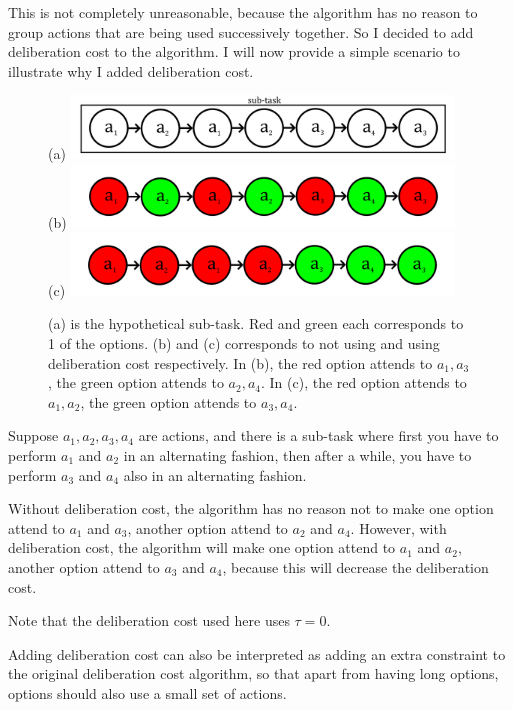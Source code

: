 \documentclass{article}
\begin{document}
	\quad This is not completely unreasonable, because the algorithm has no reason to group actions that are being used successively together. So I decided to add deliberation cost to the algorithm. I will now provide a simple scenario to illustrate why I added deliberation cost.
	\begin{figure}[h]
	\centering
	\small{(a)}
	\includegraphics[width=4in]{actionSeq.png}\\
	\small{(b)}
	\includegraphics[width=4in]{actionSeqB.png}\\
	\small{(c)}
	\includegraphics[width=4in]{actionSeqG.png}
	\caption{(a) is the hypothetical sub-task. Red and green each corresponds to 1 of the options. (b) and (c) corresponds to not using and using deliberation cost respectively. In (b), the red option attends to $a_1,a_3$, the green option attends to $a_2,a_4$. In (c), the red option attends to $a_1,a_2$, the green option attends to $a_3,a_4$.}
	\end{figure}
	
	\quad Suppose $a_1, a_2, a_3, a_4$ are actions, and there is a sub-task where first you have to perform $a_1$ and $a_2$ in an alternating fashion, then after a while, you have to perform $a_3$ and $a_4$ also in an alternating fashion.
	
	\quad Without deliberation cost, the algorithm has no reason not to make one option attend to $a_1$ and $a_3$, another option attend to $a_2$ and $a_4$. However, with deliberation cost, the algorithm will make one option attend to $a_1$ and $a_2$, another option attend to $a_3$ and $a_4$, because this will decrease the deliberation cost.

	\quad Note that the deliberation cost used here uses $\tau = 0$.
	
	\quad Adding deliberation cost can also be interpreted as adding an extra constraint to the original deliberation cost algorithm, so that apart from having long options, options should also use a small set of actions.
\end{document}
